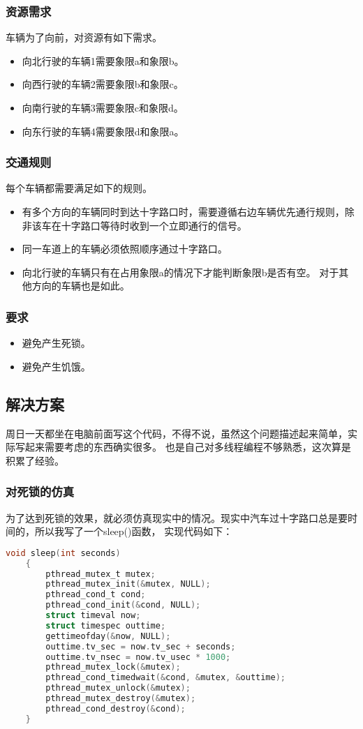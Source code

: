 \documentclass[a4paper,left=2.5cm,right=2.5cm,11pt]{article}
\begin{document}
\subsubsection{资源需求}
	车辆为了向前，对资源有如下需求。
	\begin{itemize}
		\item 向北行驶的车辆1需要象限a和象限b。
		\item 向西行驶的车辆2需要象限b和象限c。
		\item 向南行驶的车辆3需要象限c和象限d。
		\item 向东行驶的车辆4需要象限d和象限a。
	\end{itemize}
\subsubsection{交通规则}
	每个车辆都需要满足如下的规则。
	\begin{itemize}
		\item 有多个方向的车辆同时到达十字路口时，需要遵循右边车辆优先通行规则，除非该车在十字路口等待时收到一个立即通行的信号。
		\item 同一车道上的车辆必须依照顺序通过十字路口。
		\item 向北行驶的车辆只有在占用象限a的情况下才能判断象限b是否有空。
			  对于其他方向的车辆也是如此。
	\end{itemize}

\subsubsection{要求}
	\begin{itemize}
		\item 避免产生死锁。
		\item 避免产生饥饿。
	\end{itemize}

\subsection{解决方案}
	周日一天都坐在电脑前面写这个代码，不得不说，虽然这个问题描述起来简单，实际写起来需要考虑的东西确实很多。
	也是自己对多线程编程不够熟悉，这次算是积累了经验。
\subsubsection{对死锁的仿真}
	为了达到死锁的效果，就必须仿真现实中的情况。现实中汽车过十字路口总是要时间的，所以我写了一个sleep()函数，
	实现代码如下：
	\begin{lstlisting}[language = C]
	void sleep(int seconds)
	{
		pthread_mutex_t mutex;
		pthread_mutex_init(&mutex, NULL);
		pthread_cond_t cond;
		pthread_cond_init(&cond, NULL);
		struct timeval now;
		struct timespec outtime;
		gettimeofday(&now, NULL);
		outtime.tv_sec = now.tv_sec + seconds;
		outtime.tv_nsec = now.tv_usec * 1000;
		pthread_mutex_lock(&mutex);
		pthread_cond_timedwait(&cond, &mutex, &outtime);
		pthread_mutex_unlock(&mutex);
		pthread_mutex_destroy(&mutex);
		pthread_cond_destroy(&cond);
	}
	\end{lstlisting}
\end{document}
